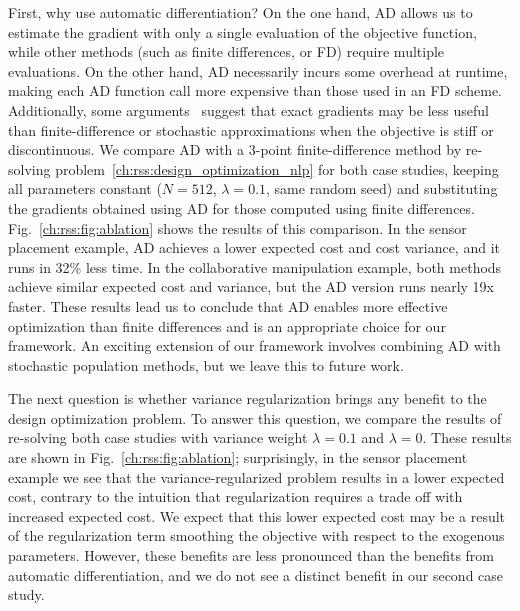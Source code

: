 First, why use automatic differentiation? On the one hand, AD allows us to estimate the gradient with only a single evaluation of the objective function, while other methods (such as finite differences, or FD) require multiple evaluations. On the other hand, AD necessarily incurs some overhead at runtime, making each AD function call more expensive than those used in an FD scheme. Additionally, some arguments~\cite{suh2021_bundled_gradients} suggest that exact gradients may be less useful than finite-difference or stochastic approximations when the objective is stiff or discontinuous. We compare AD with a 3-point finite-difference method by re-solving problem~\eqref{ch:rss:design_optimization_nlp} for both case studies, keeping all parameters constant ($N=512$, $\lambda=0.1$, same random seed) and substituting the gradients obtained using AD for those computed using finite differences. Fig.~\ref{ch:rss:fig:ablation} shows the results of this comparison. In the sensor placement example, AD achieves a lower expected cost and cost variance, and it runs in 32\% less time. In the collaborative manipulation example, both methods achieve similar expected cost and variance, but the AD version runs nearly 19x faster. These results lead us to conclude that AD enables more effective optimization than finite differences and is an appropriate choice for our framework. An exciting extension of our framework involves combining AD with stochastic population methods, but we leave this to future work.

The next question is whether variance regularization brings any benefit to the design optimization problem. To answer this question, we compare the results of re-solving both case studies with variance weight $\lambda = 0.1$ and $\lambda = 0$. These results are shown in Fig.~\ref{ch:rss:fig:ablation}; surprisingly, in the sensor placement example we see that the variance-regularized problem results in a lower expected cost, contrary to the intuition that regularization requires a trade off with increased expected cost. We expect that this lower expected cost may be a result of the regularization term smoothing the objective with respect to the exogenous parameters. However, these benefits are less pronounced than the benefits from automatic differentiation, and we do not see a distinct benefit in our second case study.

